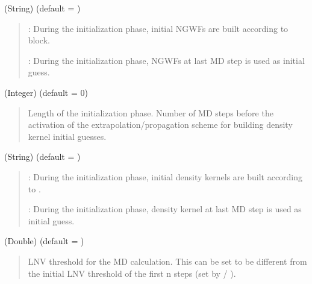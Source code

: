 \documentclass[letterpaper,10pt,english]{sphinxmanual}
\begin{document}
 (String) (default = )
\begin{quote}

\begin{DUlineblock}{0em}
\item[]  : During the initialization phase, initial NGWFs are built according to  block.
\item[]  : During the initialization phase, NGWFs at last MD step is used as initial guess.
\end{DUlineblock}
\end{quote}

 (Integer) (default = 0)
\begin{quote}

\begin{DUlineblock}{0em}
\item[] Length of the initialization phase. Number of MD steps before the activation of the extrapolation/propagation scheme for building density kernel initial guesses.
\end{DUlineblock}
\end{quote}

 (String) (default = )
\begin{quote}

\begin{DUlineblock}{0em}
\item[]  : During the initialization phase, initial density kernels are built according to .
\item[]  : During the initialization phase, density kernel at last MD step is used as initial guess.
\end{DUlineblock}
\end{quote}

 (Double) (default = )
\begin{quote}

\begin{DUlineblock}{0em}
\item[] LNV threshold for the MD calculation. This can be set to be different from the initial LNV threshold  of the first n steps (set by  / ).
\end{DUlineblock}
\end{quote}
\end{document}
